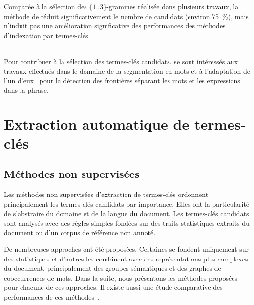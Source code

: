     Comparée à la sélection des $\{1..3\}$-grammes réalisée dans plusieurs
    travaux, la méthode de  réduit
    significativement le nombre de candidats (environ 75~\%), mais n'induit pas
    une amélioration significative des performances des méthodes d'indexation
    par termes-clés.

    ~\\Pour contribuer à la sélection des termes-clés candidats,
     se sont intéressés aux travaux
    effectués dans le domaine de la segmentation en mots et à l'adaptation de
    l'un d'eux~\cite{goldwater2009bayesianwordsegmentation} pour la détection
    des frontières séparant les mots et les expressions dans la phrase.


  \section{Extraction automatique de termes-clés}
  \label{sec:main-state_of_the_art-automatic_keyphrase_extraction}

    \subsection{Méthodes non supervisées}
    \label{subsec:main-state_of_the_art-automatic_keyphrase_extraction-unsupervised_keyphrase_extraction}
      Les méthodes non supervisées d'extraction de termes-clés ordonnent
      principalement les termes-clés candidats par importance. Elles ont la
      particularité de s'abstraire du domaine et de la langue du document. Les
      termes-clés candidats sont analysés avec des règles simples fondées sur
      des traits statistiques extraits du document ou d'un corpus de référence
      non annoté.

      De nombreuses approches ont été proposées. Certaines se fondent uniquement
      sur des statistiques et d'autres les combinent avec des représentations
      plus complexes du document, principalement des groupes sémantiques et des
      graphes de cooccurrences de mots. Dans la suite, nous présentons les
      méthodes proposées pour chacune de ces approches. Il existe aussi une
      étude comparative des performances de ces
      méthodes~\cite{hassan2010conundrums}.

